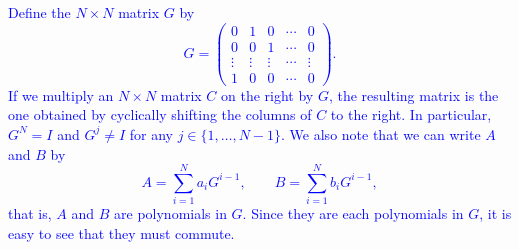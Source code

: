 \documentclass[a4paper,11pt]{article}
\newcommand{\BB}[1]{\textcolor{blue}{#1}}
\begin{document}
\BB{Define the $N \times N$ matrix $G$ by
  \[
    G=\begin{pmatrix}
        0 & 1 & 0 & \cdots & 0 \\
        0 & 0 & 1 & \cdots & 0 \\
        \vdots & \vdots & \vdots & \cdots & \vdots \\
        1 & 0 & 0 & \cdots & 0
      \end{pmatrix}.
    \]
    If we multiply an $N \times N$ matrix $C$ on the right by $G$, the resulting
    matrix is the one obtained by cyclically shifting the columns of $C$ to the
    right. In particular, $G^N=I$ and $G^j \neq I$ for any $j \in
    \{1,\dots,N-1\}$. We also note that we can write $A$ and $B$ by
    \[
      A = \sum_{i=1}^Na_iG^{i-1}, \qquad B = \sum_{i=1}^Nb_iG^{i-1},
    \]
    that is, $A$ and $B$ are polynomials in $G$. Since they are each polynomials
    in $G$, it is easy to see that they must commute. \\}
\end{document}
